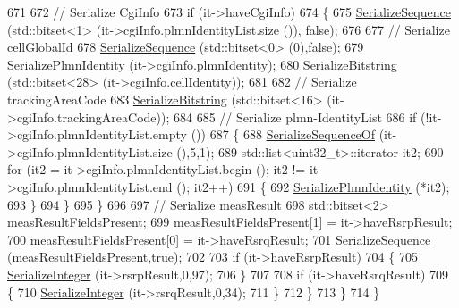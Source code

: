 \begin{DoxyCode}
671 
672           \textcolor{comment}{// Serialize CgiInfo}
673           \textcolor{keywordflow}{if} (it->haveCgiInfo)
674             \{
675               \hyperlink{classns3_1_1Asn1Header_aa9744858380443ed95836fed08799aed}{SerializeSequence} (std::bitset<1> (it->cgiInfo.plmnIdentityList.size ()),\textcolor{keyword}{
      false});
676 
677               \textcolor{comment}{// Serialize cellGlobalId}
678               \hyperlink{classns3_1_1Asn1Header_aa9744858380443ed95836fed08799aed}{SerializeSequence} (std::bitset<0> (0),\textcolor{keyword}{false});
679               \hyperlink{classns3_1_1RrcAsn1Header_a2824dcd323f61aa425479066d5982e29}{SerializePlmnIdentity} (it->cgiInfo.plmnIdentity);
680               \hyperlink{classns3_1_1Asn1Header_a0be8d507b87be07f85f35b906f8e5da7}{SerializeBitstring} (std::bitset<28> (it->cgiInfo.cellIdentity));
681 
682               \textcolor{comment}{// Serialize trackingAreaCode}
683               \hyperlink{classns3_1_1Asn1Header_a0be8d507b87be07f85f35b906f8e5da7}{SerializeBitstring} (std::bitset<16> (it->cgiInfo.trackingAreaCode));
684 
685               \textcolor{comment}{// Serialize plmn-IdentityList}
686               \textcolor{keywordflow}{if} (!it->cgiInfo.plmnIdentityList.empty ())
687                 \{
688                   \hyperlink{classns3_1_1Asn1Header_a066b6dd077bde6b0c243f3eda2621277}{SerializeSequenceOf} (it->cgiInfo.plmnIdentityList.size (),5,1);
689                   std::list<uint32\_t>::iterator it2;
690                   \textcolor{keywordflow}{for} (it2 = it->cgiInfo.plmnIdentityList.begin (); it2 != it->cgiInfo.plmnIdentityList.end
       (); it2++)
691                     \{
692                       \hyperlink{classns3_1_1RrcAsn1Header_a2824dcd323f61aa425479066d5982e29}{SerializePlmnIdentity} (*it2);
693                     \}
694                 \}
695             \}
696 
697           \textcolor{comment}{// Serialize measResult}
698           std::bitset<2> measResultFieldsPresent;
699           measResultFieldsPresent[1] = it->haveRsrpResult;
700           measResultFieldsPresent[0] = it->haveRsrqResult;
701           \hyperlink{classns3_1_1Asn1Header_aa9744858380443ed95836fed08799aed}{SerializeSequence} (measResultFieldsPresent,\textcolor{keyword}{true});
702 
703           \textcolor{keywordflow}{if} (it->haveRsrpResult)
704             \{
705               \hyperlink{classns3_1_1Asn1Header_ab1c3bd37730affa7473bc759d625c29a}{SerializeInteger} (it->rsrpResult,0,97);
706             \}
707 
708           \textcolor{keywordflow}{if} (it->haveRsrqResult)
709             \{
710               \hyperlink{classns3_1_1Asn1Header_ab1c3bd37730affa7473bc759d625c29a}{SerializeInteger} (it->rsrqResult,0,34);
711             \}
712         \}
713     \}
714 \}
\end{DoxyCode}


